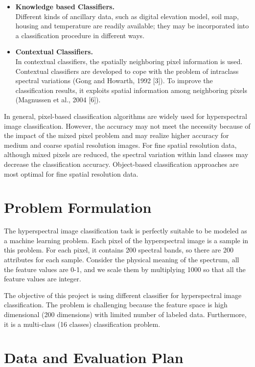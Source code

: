\documentclass[11pt]{article}
\begin{document}
\begin{itemize}
\item {\bf Knowledge based Classifiers.}\\
Different kinds of ancillary data, such as digital elevation model, soil map, housing and temperature are readily available; they may be incorporated into a classification procedure in different ways.
\item {\bf Contextual Classifiers.}\\
In contextual classifiers, the spatially neighboring pixel information is used. Contextual classifiers are developed to cope with the problem of intraclass spectral variations (Gong and Howarth, 1992 [3]). To improve the classification results, it exploits spatial information among neighboring pixels (Magnussen et al., 2004 [6]).
\end{itemize}

In general, pixel-based classification algorithms are widely used for hyperspectral image classification. However, the accuracy may not meet the necessity because of the impact of the mixed pixel problem and may realize higher accuracy for medium and coarse spatial resolution images. For fine spatial resolution data, although mixed pixels are reduced, the spectral variation within land classes may decrease the classification accuracy. Object-based classification approaches are most optimal for fine spatial resolution data. 

\section{Problem Formulation}
The hyperspectral image classification task is perfectly suitable to be modeled as a machine learning problem. Each pixel of the hyperspectral image is a sample in this problem.  For each pixel, it contains 200 spectral bands, so there are 200 attributes for each sample. Consider the physical meaning of the spectrum, all the feature values are 0-1, and we scale them by multiplying 1000 so that all the feature values are integer. 

The objective of this project is using different classifier for hyperspectral image classification. The problem is challenging because the feature space is high dimensional (200 dimensions) with limited number of labeled data. Furthermore, it is a multi-class (16 classes) classification problem. 
\section{Data and Evaluation Plan}
\end{document}
